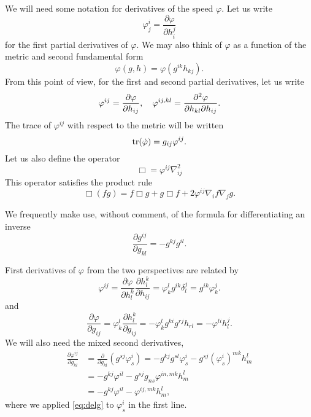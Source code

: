 \documentclass{amsart}
\begin{document}
We will need some notation for derivatives of the speed \(\varphi\). Let us write
\[
\varphi^{i}_{j} = \frac{\partial \varphi}{\partial h^{j}_{i}}
\]
for the first partial derivatives of \(\varphi\). We may also think of \(\varphi\) as a function of the metric and second fundamental form
\[
\varphi(g, h) = \varphi(g^{ik} h_{kj}).
\]
From this point of view, for the first and second partial derivatives, let us write
\[
\varphi^{ij} = \frac{\partial\varphi}{\partial h_{ij}}, \quad \varphi^{ij,kl} = \frac{\partial^2\varphi}{\partial h_{kl} \partial h_{ij}}.
\]
The trace of \(\varphi^{ij}\) with respect to the metric will be written
\[
\operatorname{tr}(\dot{\varphi}) = g_{ij} \varphi^{ij}.
\]
Let us also define the operator
\[
\Box = \varphi^{ij} \nabla^2_{ij}
\]
This operator satisfies the product rule
\begin{equation}
\label{eq:productbox}
\Box (fg) = f \Box g + g \Box f + 2 \varphi^{ij} \nabla_i f \nabla_j g.
\end{equation}

We frequently make use, without comment, of the formula for differentiating an inverse
\[
\frac{\partial g^{ij}}{\partial g_{kl}} = - g^{kj} g^{il}.
\]

First derivatives of \(\varphi\) from the two perspectives are related by
\begin{equation}
\label{eq:delh}
\varphi^{ij} = \frac{\partial \varphi}{\partial h_l^k} \frac{\partial h_l^k}{\partial h_{ij}} = \varphi^l_k g^{ik} \delta^j_l = g^{ik} \varphi^j_k.
\end{equation}
and
\begin{equation}
\label{eq:delg}
\frac{\partial\varphi}{\partial g_{ij}} = \varphi^{l}_{k} \frac{\partial h^{k}_{l}}{\partial g_{ij}} = -\varphi^{l}_{k} g^{ki} g^{rj} h_{rl} = -\varphi^{li}h^{j}_{l}.
\end{equation}
We will also need the mixed second derivatives,
\begin{equation}
\label{eq:delhdelg}
\begin{split}
\frac{\partial \varphi^{ij}}{\partial g_{kl}} &= \frac{\partial}{\partial g_{kl}} \left(g^{sj} \varphi^{i}_{s} \right) = - g^{kj}g^{sl} \varphi^{i}_{s} - g^{sj} (\varphi^i_s)^{mk} h^l_m \\
&= - g^{kj} \varphi^{il} - g^{sj} g_{ns} \varphi^{in,mk} h^l_m \\
&= - g^{kj} \varphi^{il} - \varphi^{ij,mk} h^l_m,
\end{split}
\end{equation}
where we applied \cref{eq:delg} to \(\varphi^i_s\) in the first line.
\end{document}
